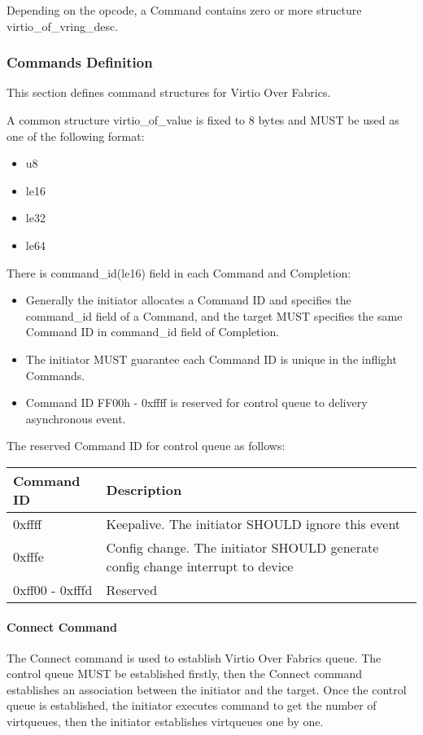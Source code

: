 Depending on the opcode, a Command contains zero or more structure virtio_of_vring_desc.

\subsubsection{Commands Definition}\label{sec:Virtio Transport Options / Virtio Over Fabrics / Transmition Protocol / Commands Definition}
This section defines command structures for Virtio Over Fabrics.

A common structure virtio_of_value is fixed to 8 bytes and MUST be used as one of the following format:

\begin{itemize}
\item u8
\item le16
\item le32
\item le64
\end{itemize}

There is command_id(le16) field in each Command and Completion:

\begin{itemize}
\item Generally the initiator allocates a Command ID and specifies the command_id field of a Command, and the target MUST specifies the same Command ID in command_id field of Completion.
\item The initiator MUST guarantee each Command ID is unique in the inflight Commands.
\item Command ID FF00h - 0xffff is reserved for control queue to delivery asynchronous event.
\end{itemize}

The reserved Command ID for control queue as follows:

\begin{tabular}{ |l|l| }
\hline
Command ID & Description \\
\hline \hline
0xffff & Keepalive. The initiator SHOULD ignore this event \\
\hline
0xfffe & Config change. The initiator SHOULD generate config change interrupt to device \\
\hline
0xff00 - 0xfffd & Reserved \\
\hline
\end{tabular}

\paragraph{Connect Command}\label{sec:Virtio Transport Options / Virtio Over Fabrics / Transmition Protocol / Commands Definition / Connect Command}
The Connect command is used to establish Virtio Over Fabrics queue. The control queue MUST be established firstly, then the Connect command establishes an association between the initiator and the target. Once the control queue is established, the initiator executes command to get the number of virtqueues, then the initiator establishes virtqueues one by one.

